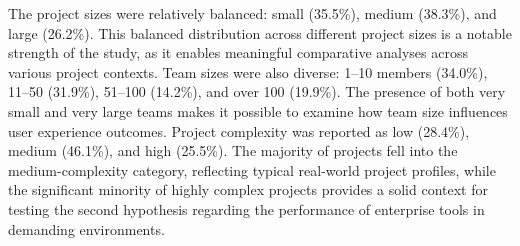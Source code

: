 \documentclass[runningheads]{llncs}
\begin{document}
The project sizes were relatively balanced: small (35.5\%), medium (38.3\%), and large (26.2\%). This balanced distribution across different project sizes is a notable strength of the study, as it enables meaningful comparative analyses across various project contexts. Team sizes were also diverse: 1–10 members (34.0\%), 11–50 (31.9\%), 51–100 (14.2\%), and over 100 (19.9\%). The presence of both very small and very large teams makes it possible to examine how team size influences user experience outcomes. Project complexity was reported as low (28.4\%), medium (46.1\%), and high (25.5\%). The majority of projects fell into the medium-complexity category, reflecting typical real-world project profiles, while the significant minority of highly complex projects provides a solid context for testing the second hypothesis regarding the performance of enterprise tools in demanding environments.
\end{document}
